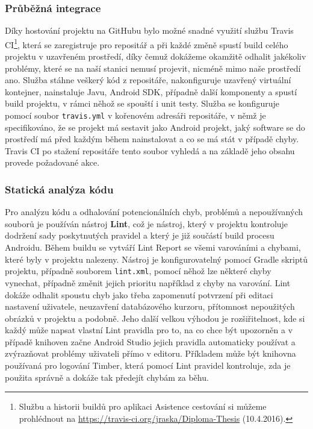 \documentclass[czech,master,public,dept460,male,java,cpdeclaration]{diploma}
\begin{document}
 \subsubsection{Průběžná integrace}
 Díky hostování projektu na GitHubu bylo možné snadné využití službu
 Travis CI\footnote{Službu a historii buildů pro aplikaci Asistence cestování si můžeme prohlédnout na \url{https://travis-ci.org/jraska/Diploma-Thesis} (10.4.2016).},
 která se zaregistruje pro repositář
 a při každé změně spustí build celého projektu v uzavřeném prostředí, díky čemuž dokážeme okamžitě
 odhalit jakékoliv problémy, které se na naší stanici nemusí projevit, nicméně mimo naše prostředí ano.
 Služba stáhne veškerý kód z repositáře, nakonfiguruje uzavřený virtuální kontejner, nainstaluje Javu, Android SDK,
 případně další komponenty a spustí build projektu, v rámci něhož se spouští i unit testy. Služba se konfiguruje pomocí
 soubor \texttt{travis.yml} v kořenovém adresáři repositáře, v němž je specifikováno, že se projekt má sestavit jako Android projekt,
 jaký software se do prostředí má před každým během nainstalovat a co se má stát v případě chyby. Travis CI po stažení
 repositáře tento soubor vyhledá a na základě jeho obsahu provede požadované akce.

 \subsubsection{Statická analýza kódu}

 Pro analýzu kódu a odhalování potencionálních chyb, problémů a nepoužívaných souborů je používán nástroj \textbf{Lint},
  což je nástroj, který v projektu kontroluje dodržení sady poskytnutých pravidel a který
  je již součástí build procesu Androidu. Během buildu se vytváří Lint Report
  se všemi varováními a chybami, které byly v projektu nalezeny. Nástroj je konfigurovatelný pomocí
  Gradle skriptů projektu, případně souborem \texttt{lint.xml}, pomocí něhož lze některé chyby
  vynechat, případně změnit jejich prioritu například z chyby na varování.
  Lint dokáže odhalit spoustu chyb jako třeba zapomenutí potvrzení při editaci nastavení uživatele,
  neuzavření databázového kurzoru, přítomnost nepoužitých obrázků v projektu a podobně.
  Jeho další velkou výhodou je rozšiřitelnost, kde si každý může napsat vlastní Lint pravidla pro to, na co chce být upozorněn
  a v případě knihoven začne Android Studio jejich pravidla automaticky používat a zvýrazňovat problémy uživateli
  přímo v editoru.
  Příkladem může být knihovna používaná pro logování Timber, která pomocí Lint pravidel
  kontroluje, zda je použita správně a dokáže tak předejít chybám za běhu.
\end{document}
